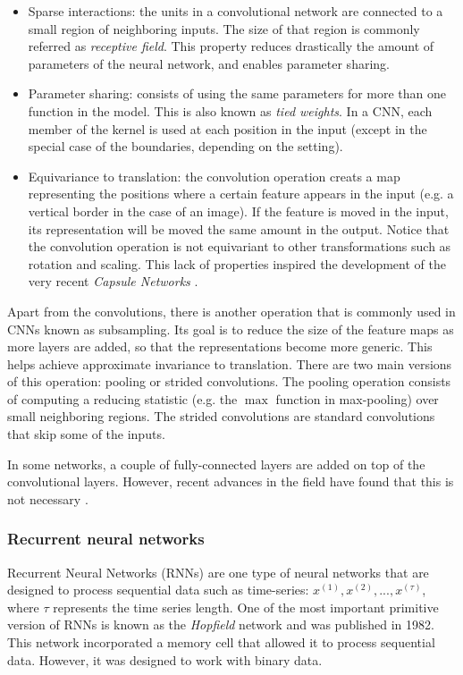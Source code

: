 \begin{itemize}
	\item Sparse interactions: the units in a convolutional network are connected to a small region of neighboring inputs. The size of that region is commonly referred as \textit{receptive field}. This property reduces drastically the amount of parameters of the neural network, and enables parameter sharing.
	\item Parameter sharing: consists of using the same parameters for more than one function in the model. This is also known as \textit{tied weights}. In a CNN, each member of the kernel is used at each position in the input (except in the special case of the boundaries, depending on the setting). 
	\item Equivariance to translation: the convolution operation creats a map representing the positions where a certain feature appears in the input (e.g. a vertical border in the case of an image). If the feature is moved in the input, its representation will be moved the same amount in the output. Notice that the convolution operation is not equivariant to other transformations such as rotation and scaling. This lack of properties inspired the development of the very recent \textit{Capsule Networks} \cite{sabour2017}.
\end{itemize}

Apart from the convolutions, there is another operation that is commonly used in CNNs known as subsampling. Its goal is to reduce the size of the feature maps as more layers are added, so that the representations become more generic. This helps achieve approximate invariance to translation. There are two main versions of this operation: pooling or strided convolutions. The pooling operation \cite{Goodfellow2016} consists of computing a reducing statistic (e.g. the $\max$ function in max-pooling) over small neighboring regions. The strided convolutions \cite{riadh2020} are standard convolutions that skip some of the inputs.

In some networks, a couple of fully-connected layers are added on top of the convolutional layers. However, recent advances in the field have found that this is not necessary \cite{shelhamer2015}.


\subsubsection{Recurrent neural networks}
\sloppy Recurrent Neural Networks (RNNs) are one type of neural networks that are designed to process sequential data such as time-series: $x^{(1)}, x^{(2)}, ..., x^{(\tau)}$, where $\tau$ represents the time series length. One of the most important primitive version of RNNs is known as the \textit{Hopfield} network \cite{hopfield1982} and was published in 1982. This network incorporated a memory cell that allowed it to process sequential data. However, it was designed to work with binary data. 


